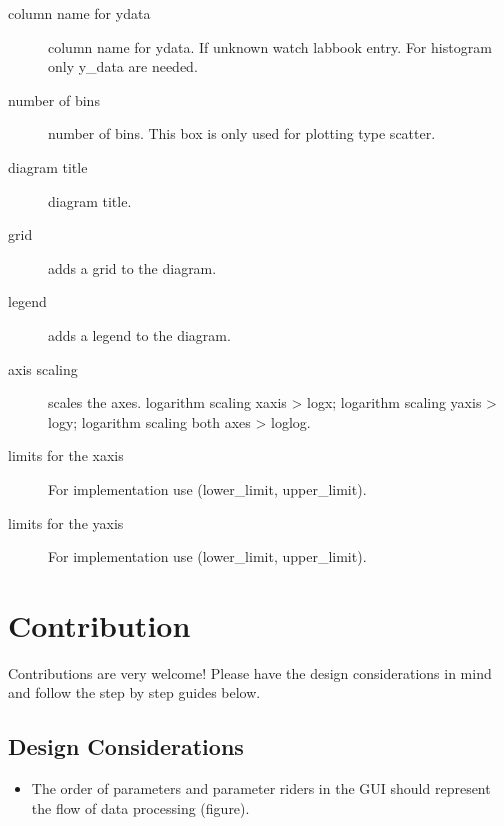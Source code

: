 \documentclass[letterpaper,10pt,english]{sphinxmanual}
\begin{document}
\begin{description}
\item[{column name for y\sphinxhyphen{}data}] \leavevmode
column name for y\sphinxhyphen{}data. If unknown watch labbook entry. For histogram only y\_data are needed.

\item[{number of bins}] \leavevmode
number of bins. This box is only used for plotting type scatter.

\item[{diagram title}] \leavevmode
diagram title.

\item[{grid}] \leavevmode
adds a grid to the diagram.

\item[{legend}] \leavevmode
adds a legend to the diagram.

\item[{axis scaling}] \leavevmode
scales the axes. logarithm scaling x\sphinxhyphen{}axis \textendash{}\textgreater{} logx; logarithm scaling y\sphinxhyphen{}axis \textendash{}\textgreater{} logy; logarithm scaling both axes \textendash{}\textgreater{} loglog.

\item[{limits for the x\sphinxhyphen{}axis}] \leavevmode
For implementation use (lower\_limit, upper\_limit).

\item[{limits for the y\sphinxhyphen{}axis}] \leavevmode
For implementation use (lower\_limit, upper\_limit).

\end{description}


\chapter{Contribution}
\label{\detokenize{contribution:contribution}}\label{\detokenize{contribution::doc}}
Contributions are very welcome! Please have the design considerations in mind and follow the step by step guides below.


\section{Design Considerations}
\label{\detokenize{contribution:design-considerations}}\begin{itemize}
\item {} 
The order of parameters and parameter riders in the GUI should represent the flow of data processing (figure).

\end{itemize}
\end{document}
